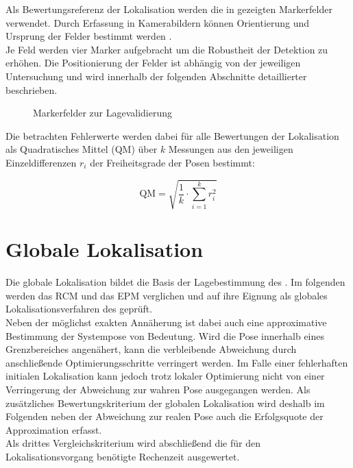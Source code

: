 Als Bewertungsreferenz der Lokalisation werden die in  gezeigten Markerfelder verwendet. Durch Erfassung in Kamerabildern können Orientierung und Ursprung der Felder bestimmt werden \cite{arsys}.\\
Je Feld werden vier Marker aufgebracht um die Robustheit der Detektion zu erhöhen. Die Positionierung der Felder ist abhängig von der jeweiligen Untersuchung und wird innerhalb der folgenden Abschnitte detaillierter beschrieben.\\

\begin{figure}[!ht]
	\begin{center}
	
	\hspace{5mm}
	\caption{Markerfelder zur Lagevalidierung}
	\label{fig.armarker}
	\end{center}
\end{figure}

Die betrachten Fehlerwerte werden dabei für alle Bewertungen der Lokalisation als Quadratisches Mittel (QM) über $k$ Messungen aus den jeweiligen Einzeldifferenzen $r_i$ der Freiheitsgrade der Posen bestimmt:

\begin{equation}
\mathrm{QM} = \sqrt{\frac{1}{k} \cdot \sum_{i=1}^kr_i^2}
\end{equation}



\section{Globale Lokalisation}
Die globale Lokalisation bildet die Basis der Lagebestimmung des . Im folgenden werden das RCM und das EPM verglichen und auf ihre Eignung als globales Lokalisationsverfahren des  geprüft.\\
Neben der möglichst exakten Annäherung ist dabei auch eine approximative Bestimmung der Systempose von Bedeutung. Wird die Pose innerhalb eines Grenzbereiches angenähert, kann die verbleibende Abweichung durch anschließende Optimierungsschritte verringert werden. Im Falle einer fehlerhaften initialen Lokalisation kann jedoch trotz lokaler Optimierung nicht von einer Verringerung der Abweichung zur wahren Pose ausgegangen werden. Als zusätzliches Bewertungskriterium der globalen Lokalisation wird deshalb im Folgenden neben der Abweichung zur realen Pose auch die Erfolgsquote der Approximation erfasst.\\
Als drittes Vergleichskriterium wird abschließend die für den Lokalisationsvorgang benötigte Rechenzeit ausgewertet.\\

